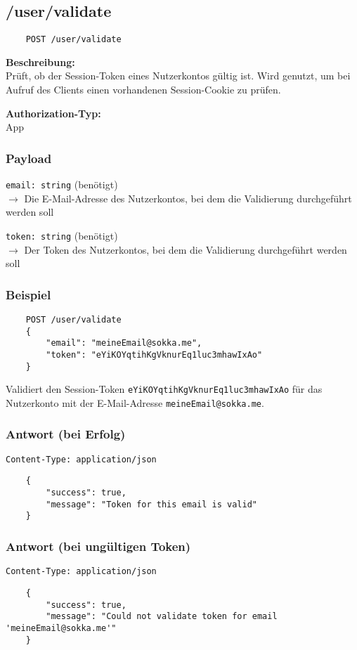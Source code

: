\subsection{/user/validate}

\begin{lstlisting}
    POST /user/validate
\end{lstlisting}

\textbf{Beschreibung:} \\
Prüft, ob der Session-Token eines Nutzerkontos gültig ist. Wird genutzt, um bei Aufruf des Clients einen vorhandenen Session-Cookie zu prüfen.

\textbf{Authorization-Typ:} \\
App

\subsubsection{Payload}

\lstinline{email: string} (benötigt) \\
$\rightarrow$ Die E-Mail-Adresse des Nutzerkontos, bei dem die Validierung durchgeführt werden soll

\lstinline{token: string} (benötigt) \\
$\rightarrow$ Der Token des Nutzerkontos, bei dem die Validierung durchgeführt werden soll

\subsubsection{Beispiel}

\begin{lstlisting}
    POST /user/validate
    {
        "email": "meineEmail@sokka.me",
        "token": "eYiKOYqtihKgVknurEq1luc3mhawIxAo"
    }
\end{lstlisting}

Validiert den Session-Token \lstinline{eYiKOYqtihKgVknurEq1luc3mhawIxAo} für das Nutzerkonto mit der E-Mail-Adresse \lstinline{meineEmail@sokka.me}.

\subsubsection{Antwort (bei Erfolg)}

\lstinline{Content-Type: application/json}
\begin{lstlisting}
    {
        "success": true, 
        "message": "Token for this email is valid"
    }
\end{lstlisting}

\subsubsection{Antwort (bei ungültigen Token)}

\lstinline{Content-Type: application/json}
\begin{lstlisting}
    {
        "success": true, 
        "message": "Could not validate token for email 'meineEmail@sokka.me'"
    }
\end{lstlisting}
